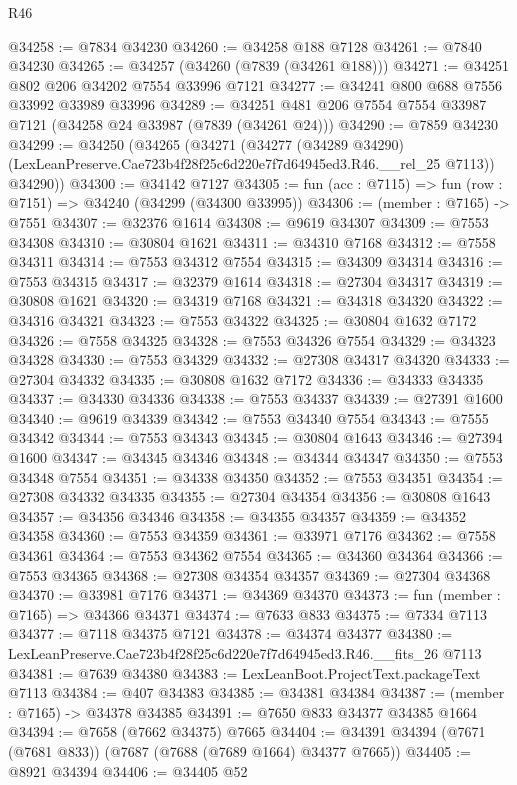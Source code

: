 \begin{lexlean}{R46}
\begin{coremodule}
@34258 := @7834 @34230
@34260 := @34258 @188 @7128
@34261 := @7840 @34230
@34265 := @34257 (@34260 (@7839 (@34261 @188)))
@34271 := @34251 @802 @206 @34202 @7554 @33996 @7121
@34277 := @34241 @800 @688 @7556 @33992 @33989 @33996
@34289 := @34251 @481 @206 @7554 @7554 @33987 @7121 (@34258 @24 @33987 (@7839 (@34261 @24)))
@34290 := @7859 @34230
@34299 := @34250
    (@34265
      (@34271
        (@34277
          (@34289 @34290)
          (LexLeanPreserve.Cae723b4f28f25c6d220e7f7d64945ed3.R46.__rel_25 @7113))
        @34290))
@34300 := @34142 @7127
@34305 := fun (acc : @7115) => fun (row : @7151) => @34240 (@34299 (@34300 @33995))
@34306 := (member : @7165) -> @7551
@34307 := @32376 @1614
@34308 := @9619 @34307
@34309 := @7553 @34308
@34310 := @30804 @1621
@34311 := @34310 @7168
@34312 := @7558 @34311
@34314 := @7553 @34312 @7554
@34315 := @34309 @34314
@34316 := @7553 @34315
@34317 := @32379 @1614
@34318 := @27304 @34317
@34319 := @30808 @1621
@34320 := @34319 @7168
@34321 := @34318 @34320
@34322 := @34316 @34321
@34323 := @7553 @34322
@34325 := @30804 @1632 @7172
@34326 := @7558 @34325
@34328 := @7553 @34326 @7554
@34329 := @34323 @34328
@34330 := @7553 @34329
@34332 := @27308 @34317 @34320
@34333 := @27304 @34332
@34335 := @30808 @1632 @7172
@34336 := @34333 @34335
@34337 := @34330 @34336
@34338 := @7553 @34337
@34339 := @27391 @1600
@34340 := @9619 @34339
@34342 := @7553 @34340 @7554
@34343 := @7555 @34342
@34344 := @7553 @34343
@34345 := @30804 @1643
@34346 := @27394 @1600
@34347 := @34345 @34346
@34348 := @34344 @34347
@34350 := @7553 @34348 @7554
@34351 := @34338 @34350
@34352 := @7553 @34351
@34354 := @27308 @34332 @34335
@34355 := @27304 @34354
@34356 := @30808 @1643
@34357 := @34356 @34346
@34358 := @34355 @34357
@34359 := @34352 @34358
@34360 := @7553 @34359
@34361 := @33971 @7176
@34362 := @7558 @34361
@34364 := @7553 @34362 @7554
@34365 := @34360 @34364
@34366 := @7553 @34365
@34368 := @27308 @34354 @34357
@34369 := @27304 @34368
@34370 := @33981 @7176
@34371 := @34369 @34370
@34373 := fun (member : @7165) => @34366 @34371
@34374 := @7633 @833
@34375 := @7334 @7113
@34377 := @7118 @34375 @7121
@34378 := @34374 @34377
@34380 := LexLeanPreserve.Cae723b4f28f25c6d220e7f7d64945ed3.R46.__fits_26 @7113
@34381 := @7639 @34380
@34383 := LexLeanBoot.ProjectText.packageText @7113
@34384 := @407 @34383
@34385 := @34381 @34384
@34387 := (member : @7165) -> @34378 @34385
@34391 := @7650 @833 @34377 @34385 @1664
@34394 := @7658 (@7662 @34375) @7665
@34404 := @34391 @34394 (@7671 (@7681 @833)) (@7687 (@7688 (@7689 @1664) @34377 @7665))
@34405 := @8921 @34394
@34406 := @34405 @52

\end{coremodule}
\end{lexlean}
